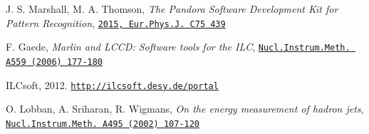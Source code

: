 \documentclass[cits]{JINST}
\begin{document}
\begin{thebibliography}{99}
J. S. Marshall, M. A. Thomson, \emph{The Pandora Software Development Kit for Pattern Recognition}, \href{http://dx.doi.org/10.1140/epjc/s10052-015-3659-3}{\tt 2015, Eur.Phys.J. C75 439}

F. Gaede, {\it Marlin and LCCD: Software tools for the ILC}, \href{http://dx.doi.org/10.1016/j.nima.2005.11.138}{\tt Nucl.Instrum.Meth. A559 (2006) 177-180}

ILCsoft, 2012. \href{http://ilcsoft.desy.de/portal}{\tt http://ilcsoft.desy.de/portal}

O. Lobban, A. Sriharan, R. Wigmans,  \emph{On the energy measurement of hadron jets}, \href{http://dx.doi.org/10.1016/S0168-9002(02)01615-7}{\tt Nucl.Instrum.Meth. A495 (2002) 107-120}

\end{thebibliography}
\end{document}
